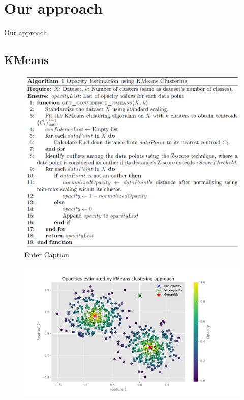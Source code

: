 \documentclass[aspectratio=169]{beamer}
\begin{document}
\section{Our approach}
\begin{frame}
    \begin{center}
        \Huge Our approach
    \end{center}
\end{frame}
\subsection{{\rm KMeans}}
\begin{frame}
\begin{figure}
    \centering
    \includegraphics[width=0.68\linewidth]{alg_kmeans_opacity.png}
    \caption{Enter Caption}
    \label{fig:enter-label}
\end{figure}
\end{frame}

\begin{frame}
\begin{figure}
    \centering
    \includegraphics[width=0.78\linewidth]{kmeans_opactiy.png}
    \label{fig:enter-label}
\end{figure}
\end{frame}
\end{document}
